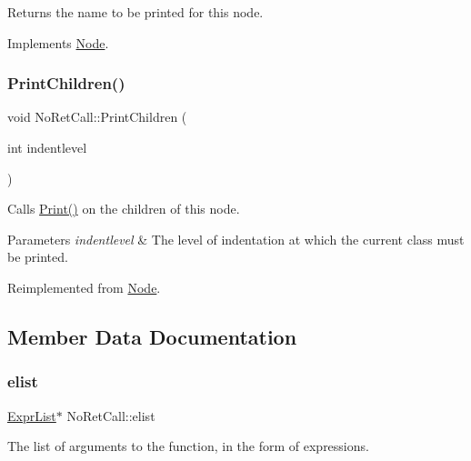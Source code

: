 Returns the name to be printed for this node. 

Implements \hyperlink{class_node_a56e29657306ffb004d69c6929ae44269}{Node}.

\mbox{\label{class_no_ret_call_a1645309e5db0b7b6ced656a304248600}} 
\subsubsection{\texorpdfstring{Print\+Children()}{PrintChildren()}}
{\footnotesize\ttfamily void No\+Ret\+Call\+::\+Print\+Children (\begin{DoxyParamCaption}\item[{int}]{indentlevel }\end{DoxyParamCaption})\hspace{0.3cm}{\ttfamily [virtual]}}

Calls \hyperlink{class_node_a9ef727fd72d1a37792b3db60a8a479dd}{Print()} on the children of this node. 
\begin{DoxyParams}{Parameters}
{\em indentlevel} & The level of indentation at which the current class must be printed. \\
\hline
\end{DoxyParams}


Reimplemented from \hyperlink{class_node_a3e67ec8d22182b721717af14fe0c3000}{Node}.



\subsection{Member Data Documentation}
\mbox{\label{class_no_ret_call_a2ce5041d16e7ac1ea8b338ad2005d7a2}} 
\subsubsection{\texorpdfstring{elist}{elist}}
{\footnotesize\ttfamily \hyperlink{class_expr_list}{Expr\+List}$\ast$ No\+Ret\+Call\+::elist\hspace{0.3cm}{\ttfamily [protected]}}

The list of arguments to the function, in the form of expressions. \mbox{\label{class_no_ret_call_af4879d2f433a03c715e74124d636f4d2}} 
